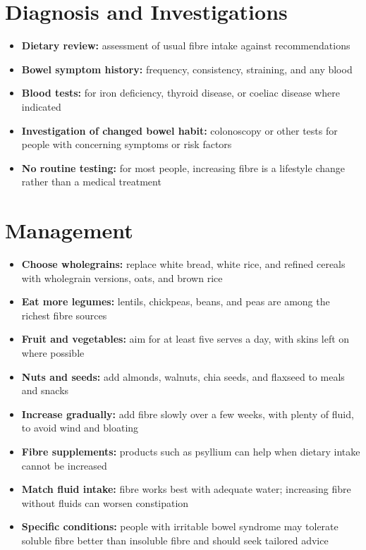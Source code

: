 \section*{Diagnosis and Investigations}
\begin{itemize}
    \item \textbf{Dietary review:} assessment of usual fibre intake against recommendations
    \item \textbf{Bowel symptom history:} frequency, consistency, straining, and any blood
    \item \textbf{Blood tests:} for iron deficiency, thyroid disease, or coeliac disease where indicated
    \item \textbf{Investigation of changed bowel habit:} colonoscopy or other tests for people with concerning symptoms or risk factors
    \item \textbf{No routine testing:} for most people, increasing fibre is a lifestyle change rather than a medical treatment
\end{itemize}

\section*{Management}
\begin{itemize}
    \item \textbf{Choose wholegrains:} replace white bread, white rice, and refined cereals with wholegrain versions, oats, and brown rice
    \item \textbf{Eat more legumes:} lentils, chickpeas, beans, and peas are among the richest fibre sources
    \item \textbf{Fruit and vegetables:} aim for at least five serves a day, with skins left on where possible
    \item \textbf{Nuts and seeds:} add almonds, walnuts, chia seeds, and flaxseed to meals and snacks
    \item \textbf{Increase gradually:} add fibre slowly over a few weeks, with plenty of fluid, to avoid wind and bloating
    \item \textbf{Fibre supplements:} products such as psyllium can help when dietary intake cannot be increased
    \item \textbf{Match fluid intake:} fibre works best with adequate water; increasing fibre without fluids can worsen constipation
    \item \textbf{Specific conditions:} people with irritable bowel syndrome may tolerate soluble fibre better than insoluble fibre and should seek tailored advice
\end{itemize}

